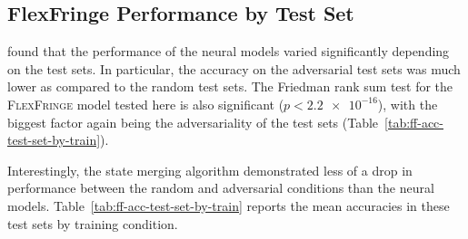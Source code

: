 \documentclass[twoside,11pt]{article}
\newcommand{\origRand}{IR\xspace}
\newcommand{\longRand}{LR\xspace}
\newcommand{\origAdv}{IA\xspace}
\newcommand{\longAdv}{LA\xspace}
\begin{document}


\subsection{FlexFringe Performance by Test Set} \label{sec:res-test}

 found that the performance of the neural models
varied significantly depending on the test sets. In particular, the
accuracy on the adversarial test sets was much lower as compared to
the random test sets. 
The Friedman rank sum test for the \textsc{FlexFringe}
model tested here is also significant (\(p < \num{2.2e-16}\)), with
the biggest factor again being the adversariality of the test sets
(Table~\ref{tab:ff-acc-test-set-by-train}).

Interestingly, the state merging algorithm demonstrated less of a drop in performance between the random and adversarial conditions than the neural models.
Table~\ref{tab:ff-acc-test-set-by-train} reports
the mean accuracies in these test sets by training condition.
\end{document}
